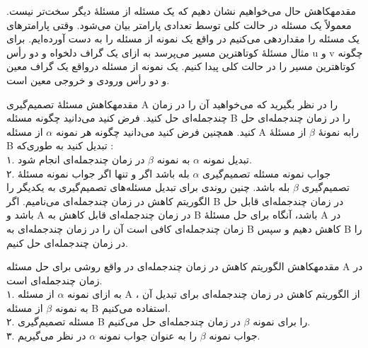 \begin{itemframe-s}{مقدمه}{کاهش}
\itm
حال می‌خواهیم نشان دهیم که یک مسئله از مسئلهٔ دیگر سخت‌تر نیست.
\itm
معمولاً یک مسئله در حالت کلی توسط تعدادی پارامتر بیان می‌شود. وقتی پارامترهای یک مسئله را مقداردهی می‌کنیم در واقع یک نمونه
از مسئله را به دست آورده‌ایم.
\itm
برای مثال مسئلهٔ کوتاهترین مسیر می‌پرسد به ازای یک گراف دلخواه و دو رأس u و v چگونه کوتاهترین مسیر را در حالت کلی پیدا کنیم. یک نمونه از مسئله درواقع یک گراف معین و دو رأس ورودی و خروجی معین است.
\end{itemframe-s}

\begin{itemframe-s}{مقدمه}{کاهش}
\itm
مسئلهٔ تصمیم‌گیری A را در نظر بگیرید که می‌خواهید آن را در زمان چندجمله‌ای حل کنید.
\itm
فرض کنید می‌دانید چگونه مسئله B را در زمان چند‌جمله‌ای حل کنید.
\itm
همچنین فرض کنید می‌دانید چگونه هر نمونه
$\alpha$
از مسئله A رابه نمونهٔ
$\beta$
از مسئلهٔ B تبدیل کنید به طوری‌که :\\
۱. تبدیل نمونه
$\alpha$
به نمونه
$\beta$
در زمان چند‌جمله‌ای انجام شود.\\
۲. جواب نمونه مسئله تصمیم‌گیری
$\alpha$
بله باشد اگر و تنها اگر جواب نمونه مسئلهٔ تصمیم‌گیری
$\beta$
بله باشد.
\itm
چنین روندی برای تبدیل مسئله‌های تصمیم‌گیری به یکدیگر را الگوریتم کاهش در زمان چندجمله‌ای
می‌نامیم.
\itm
اگر B در زمان چندجمله‌ای قابل حل باشد و A در زمان چندجمله‌ای قابل کاهش به B باشد، آنگاه برای حل مسئلهٔ A در زمان چندجمله‌ای کافی است آن را در زمان چندجمله‌ای به B کاهش دهیم و سپس B را در زمان چندجمله‌ای حل کنیم.
\end{itemframe-s}

\begin{itemframe-s}{مقدمه}{کاهش}
\itm
الگوریتم کاهش در زمان چندجمله‌ای در واقع روشی برای حل مسئله A در زمان چند‌جمله‌ای است.\\
۱. به ازای نمونه
$\alpha$
از مسئله A ، از الگوریتم کاهش در زمان چندجمله‌ای برای تبدیل آن به نمونه
$\beta$
از مسئله B استفاده می‌کنیم.\\
۲. مسئله تصمیم‌گیری B را برای نمونه
$\beta$
در زمان چندجمله‌ای حل می‌کنیم.\\
۳. جواب نمونه
$\beta$
را به عنوان جواب نمونه
$\alpha$
در نظر می‌گیریم.
\end{itemframe-s}

